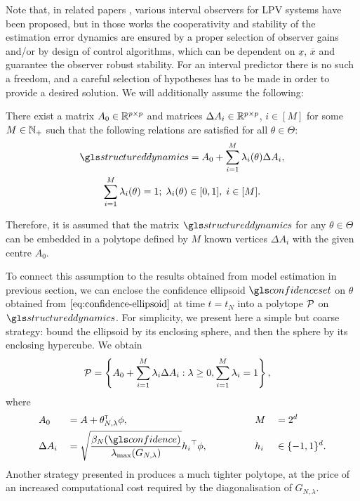 Note that, in related papers \citep{AitRami2008,RVZ10,Bolajraf2011,Efimov_a2013,Efimov_tac2013,Chebotarev2015}, various interval observers for \gls{LPV} systems have been proposed, but in those works the cooperativity and stability of the estimation error dynamics are ensured by a proper selection of observer gains and/or by design of control algorithms, which can be dependent on $\underline{x}$, $\overline{x}$ and guarantee the observer robust stability. For an interval predictor there is no such a freedom, and a careful selection of hypotheses has to be made in order to provide a desired solution.
We will additionally assume the following:
\begin{assumption}
	\label{assumpt:polytope}
	\begin{leftbar}[assumptionbar]
	There exist a matrix $A_{0}\in\mathbb{R}^{p\times p}$ and matrices $\Delta A_{i}\in\mathbb{R}^{p\times p}$, $i\in[M]$ for some $M\in\mathbb{N}_{+}$ such that the following relations are satisfied for all $\theta\in\Theta$:
	\begin{gather*}
	\structureddynamics=A_{0}+\sum_{i=1}^{M}\lambda_{i}(\theta)\Delta A_{i},\\
	\sum_{i=1}^{M}\lambda_{i}(\theta)=1;\;\lambda_{i}(\theta)\in[0,1],\;i\in[M].
	\end{gather*}
	\end{leftbar}
\end{assumption}
Therefore, it is assumed that the matrix $\structureddynamics$ for any $\theta\in\Theta$ can be embedded in a polytope defined by $M$ known vertices $\Delta A_{i}$ with the given centre $A_{0}$. 

To connect this assumption to the results obtained from model estimation in previous section, we can enclose the confidence ellipsoid $\confidenceset$ on $\theta$ obtained from $\eqref{eq:confidence-ellipsoid}$ at time $t=t_N$ into a polytope $\mathcal{P}$ on $\structureddynamics$. For simplicity, we present here a simple but coarse strategy: bound the ellipsoid by its enclosing sphere, and then the sphere by its enclosing hypercube. We obtain
\begin{align}
\label{eq:polytope}
&\mathcal{P} = \left\{ A_{0}+\sum_{i=1}^{M}\lambda_{i}\Delta A_{i}: \lambda\geq 0,  \sum_{i=1}^{M}\lambda_{i}=1\right\},
\end{align}
where 
\begin{alignat*}{4}
&A_{0}&&=A + \theta_{N,\lambda}^\transp\phi, & \hspace{4em}
&M &&= 2^d\\
&\Delta A_{i}&&= \sqrt{\frac{\beta_N(\confidence)}{\lambda_{\max}(G_{N,\lambda})}}{h_i}^\top\phi,& 
&h_i&&\in\{-1,1\}^d.
\end{alignat*}
Another strategy presented in  produces a much tighter polytope, at the price of an increased computational cost required by the diagonalisation of $G_{N,\lambda}$.

